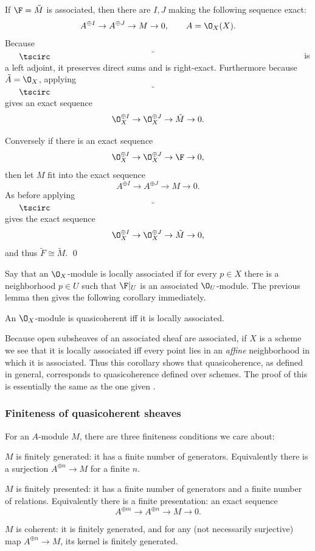 \elemm

\bproof

    If $\F=\tilde M$ is associated, then there are $I,J$ making the following sequence exact:
    $$ A^{\oplus I} \to A^{\oplus J} \to M \to 0 ,\qquad A=\O_X(X) . $$
    Because $\tilde\bul$ is a left adjoint, it preserves direct sums and is right-exact.
    Furthermore because $\tilde A=\O_X$, applying $\tilde\bul$ gives an exact sequence
    $$ \O_X^{\oplus I} \to \O_X^{\oplus J} \to \tilde M \to 0 . $$

    Conversely if there is an exact sequence
    $$ \O_X^{\oplus I} \to \O_X^{\oplus J} \to \F \to 0 , $$
    then let $M$ fit into the exact sequence
    $$ A^{\oplus I} \to A^{\oplus J} \to M \to 0 . $$
    As before applying $\tilde\bul$ gives the exact sequence
    $$ \O_X^{\oplus I} \to \O_X^{\oplus J} \to \tilde M \to 0 , $$
    and thus $\tilde F\cong\tilde M$.
    \qed

\eproof

Say that an $\O_X$-module is {\emphcolor locally associated} if for every $p\in X$ there is a neighborhood $p\in U$ such that $\F|_U$ is an associated $\O_U$-module.
The previous lemma then gives the following corollary immediately.

\bcoro

    An $\O_X$-module is quasicoherent iff it is locally associated.

\ecoro

Because open subsheaves of an associated sheaf are associated, if $X$ is a scheme we see that it is locally associated iff every point lies in an {\it affine\/} neighborhood
in which it is associated.
Thus this corollary shows that quasicoherence, as defined in general, corresponds to quasicoherence defined over schemes.
The proof of this is essentially the same as the one given .

\subsubsection{Finiteness of quasicoherent sheaves}

For an $A$-module $M$, there are three finiteness conditions we care about:
\benum
    \item $M$ is {\emphcolor finitely generated}: it has a finite number of generators.
    Equivalently there is a surjection $A^{\oplus n}\to M$ for a finite $n$.
    \item $M$ is {\emphcolor finitely presented}: it has a finite number of generators and a finite number of relations.
    Equivalently there is a {\emphcolor finite presentation}: an exact sequence
    $$ A^{\oplus m} \to A^{\oplus n} \to M \to 0 . $$
    \item $M$ is {\emphcolor coherent}: it is finitely generated, and for any (not necessarily surjective) map $A^{\oplus n}\to M$, its kernel is finitely generated.
\eenum


